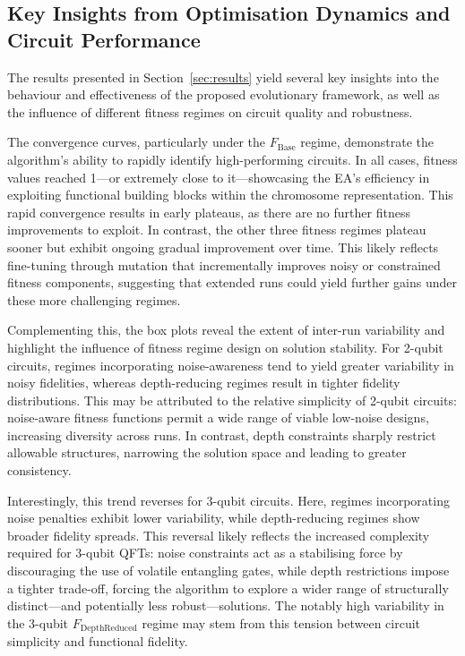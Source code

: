 \documentclass[11pt,a4paper]{article}
\begin{document}
\subsection{Key Insights from Optimisation Dynamics and Circuit Performance}

The results presented in Section~\ref{sec:results} yield several key insights into the behaviour and effectiveness of the proposed evolutionary framework, as well as the influence of different fitness regimes on circuit quality and robustness.\newline

The convergence curves, particularly under the $F_{\mathrm{Base}}$ regime, demonstrate the algorithm’s ability to rapidly identify high-performing circuits. In all cases, fitness values reached 1—or extremely close to it—showcasing the EA’s efficiency in exploiting functional building blocks within the chromosome representation. This rapid convergence results in early plateaus, as there are no further fitness improvements to exploit. In contrast, the other three fitness regimes plateau sooner but exhibit ongoing gradual improvement over time. This likely reflects fine-tuning through mutation that incrementally improves noisy or constrained fitness components, suggesting that extended runs could yield further gains under these more challenging regimes.\newline

Complementing this, the box plots reveal the extent of inter-run variability and highlight the influence of fitness regime design on solution stability. For 2-qubit circuits, regimes incorporating noise-awareness tend to yield greater variability in noisy fidelities, whereas depth-reducing regimes result in tighter fidelity distributions. This may be attributed to the relative simplicity of 2-qubit circuits: noise-aware fitness functions permit a wide range of viable low-noise designs, increasing diversity across runs. In contrast, depth constraints sharply restrict allowable structures, narrowing the solution space and leading to greater consistency.\newline

Interestingly, this trend reverses for 3-qubit circuits. Here, regimes incorporating noise penalties exhibit lower variability, while depth-reducing regimes show broader fidelity spreads. This reversal likely reflects the increased complexity required for 3-qubit QFTs: noise constraints act as a stabilising force by discouraging the use of volatile entangling gates, while depth restrictions impose a tighter trade-off, forcing the algorithm to explore a wider range of structurally distinct—and potentially less robust—solutions. The notably high variability in the 3-qubit $F_{\mathrm{DepthReduced}}$ regime may stem from this tension between circuit simplicity and functional fidelity.\newline
\end{document}
